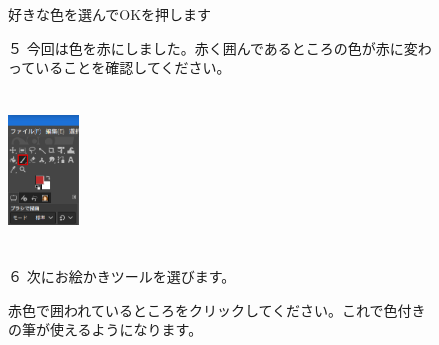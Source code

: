 \documentclass[a4paper,12pt]{jarticle}
\begin{document}
\begin{figure}[ht]
\begin{minipage}{\textwidth}
\begin{minipage}{8.984cm}
      好きな色を選んでOKを押します


      \bigskip
      \begin{minipage}{5.984cm}
        ５
        今回は色を赤にしました。赤く囲んであるところの色が赤に変わっていることを確認してください。


      \end{minipage}
    \end{minipage}
  \end{minipage}

  \includegraphics[width=1.866cm,height=4.15cm]{textbook-img127.png}
  \begin{minipage}[b]{6.663cm}
    ６ 次にお絵かきツールを選びます。

    赤色で囲われているところをクリックしてください。これで色付きの筆が使えるようになります。


    \bigskip

  \end{minipage}
\end{figure}
\clearpage
\end{document}
